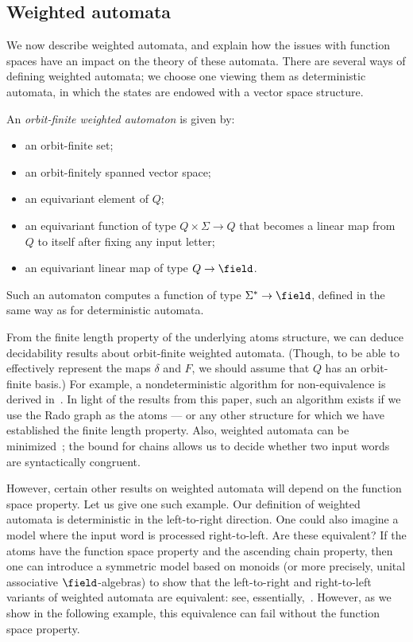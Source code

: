 \subsection{Weighted automata} 
We now describe weighted automata, and explain how the issues with function spaces have an impact on the theory of these automata. 
There are several ways of defining weighted automata; 
we choose one viewing them as deterministic automata, in which the states are endowed with a vector space structure.  

\begin{definition}\label{def:orbit-finite-weighted}
    An \emph{orbit-finite weighted automaton} is given by: 
    \begin{itemize}
        \item[$\Sigma$] an orbit-finite set;
        \item[$Q$] an orbit-finitely spanned vector space;
        \item[$q_0$] an equivariant element of $Q$;
        \item[$\delta$] an equivariant function of type $Q \times \Sigma \to Q$ that becomes a linear map from $Q$ to itself after fixing any input letter;
        \item[$\field$] an equivariant linear map of type $Q \to \field$.
    \end{itemize}
    Such an automaton computes a function of type $\Sigma^* \to \field$, defined in the same way as for deterministic automata. 
\end{definition}


From the finite length property of the underlying atoms structure, we can deduce decidability results about orbit-finite weighted automata. 
(Though, to be able to effectively represent the maps $\delta$ and $F$, we should assume that $Q$ has an orbit-finite basis.)
For example, a nondeterministic algorithm for non-equivalence is derived in~\cite[Sec.~5]{BFKM24}. 
In light of the results from this paper, such an algorithm exists if we use the Rado graph as the atoms 
--- or any other structure for which we have established the finite length property. 
Also, weighted automata can be minimized~\cite[Sec.~7]{BFKM24}; 
the bound for chains allows us to decide whether two input words are syntactically congruent.

However, certain other results on weighted automata will depend on the function space property. 
Let us give one such example. 
Our definition of weighted automata is deterministic in the left-to-right direction. 
One could also imagine a model where the input word is processed right-to-left. 
Are these equivalent? 
If the atoms have the function space property and the ascending chain property, then one can introduce a symmetric model based on monoids (or more precisely, unital associative $\field$-algebras) to show that 
the left-to-right and right-to-left variants of weighted automata are equivalent: see, essentially,~\cite[Thm.~7.4]{BFKM24}. 
However, as we show in the following example, this equivalence can fail without the function space property.

